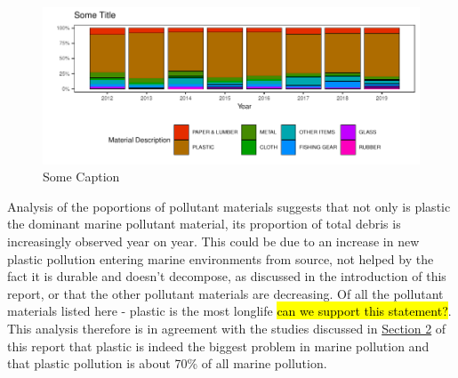 \documentclass[10pt]{article}\usepackage[]{graphicx}\usepackage[]{color}
\makeatletter
\newenvironment{kframe}{%
 \def\at@end@of@kframe{}%
 \ifinner\ifhmode%
  \def\at@end@of@kframe{\end{minipage}}%
  \begin{minipage}{\columnwidth}%
 \fi\fi%
 \def\FrameCommand##1{\hskip\@totalleftmargin \hskip-\fboxsep
 \colorbox{shadecolor}{##1}\hskip-\fboxsep
     \hskip-\linewidth \hskip-\@totalleftmargin \hskip\columnwidth}%
 \MakeFramed {\advance\hsize-\width
   \@totalleftmargin\z@ \linewidth\hsize
   \@setminipage}}%
 {\par\unskip\endMakeFramed%
 \at@end@of@kframe}
\newenvironment{knitrout}{}{} %
\makeatother
\begin{document}
\begin{figure}[H]
\begin{center}
\begin{knitrout}
\begin{kframe}
\begin{alltt}
\end{alltt}
\end{kframe}
\includegraphics[width=1\linewidth]{figure/unnamed-chunk-23-1} 

\end{knitrout}
\caption {Some Caption}
\label{fig1}
\end {center}
\end {figure}

Analysis of the poportions of pollutant materials suggests that not only is plastic the dominant marine pollutant material, its proportion of total debris is increasingly observed year on year. This could be due to an increase in new plastic pollution entering marine environments from source, not helped by the fact it is durable and doesn't decompose, as discussed in the introduction of this report, or that the other pollutant materials are decreasing. Of all the pollutant materials listed here - plastic is the most longlife \hl{can we support this statement?}. This analysis therefore is in agreement with the studies discussed in \hyperref[research]{Section 2} of this report that plastic is indeed the biggest problem in marine pollution and that plastic pollution is about 70\% of all marine pollution. 
\end{document}
